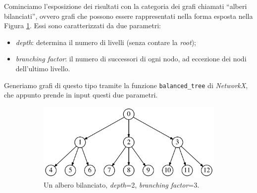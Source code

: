 Cominciamo l'esposizione dei risultati con la categoria dei grafi chiamati ``alberi bilanciati'', ovvero grafi che possono essere rappresentati nella forma esposta nella Figura \ref{fig:balanced_tree}. Essi sono caratterizzati da due parametri:
\begin{itemize}
    \item \emph{depth}: determina il numero di livelli (senza contare la \emph{root});
    \item \emph{branching factor}: il numero di successori di ogni nodo, ad eccezione dei nodi dell'ultimo livello.
\end{itemize}
Generiamo grafi di questo tipo tramite la funzione \verb|balanced_tree| di \emph{NetworkX}, che appunto prende in input questi due parametri.

\begin{figure}
    \centering
    \begin{subfigure}[b]{0.4\textwidth}
        \includegraphics[width=\textwidth]{./sezione3/experimental_results/plots/tree_graph.png}
        \caption{Un albero bilanciato, \emph{depth}=2, \emph{branching factor}=3.}
        \label{fig:balanced_tree}
    \end{subfigure}
    \qquad
    \begin{subfigure}[b]{0.1\textwidth}
        \centering

\end{subfigure}
\end{figure}
